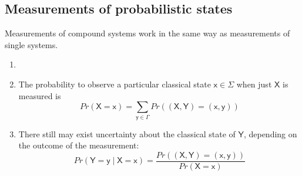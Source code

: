 \documentclass{report}
\begin{document}

\newpage

\subsection{Measurements of probabilistic states}
Measurements of compound systems work in the same way as measurements of single systems.


\begin{sol}
    \begin{enumerate}
        \item[]
        \item The probability to observe a particular classical state $\mathsf{x}\in\Sigma$ when just $\mathsf{X}$ is measured is
        \begin{equation*}
            Pr(\mathsf{X}=\mathsf{x})=\sum\limits_{\mathsf{y}\in\Gamma}Pr((\mathsf{X},\mathsf{Y})=(\mathsf{x},\mathsf{y}))
        \end{equation*}
        \item There still may exist uncertainty about the classical state of $\mathsf{Y}$, depending on the outcome of the measurement:
        \begin{equation*}
            Pr(\mathsf{Y}=\mathsf{y}\mid \mathsf{X}=\mathsf{x})=\dfrac{Pr((\mathsf{X},\mathsf{Y})=(\mathsf{x},\mathsf{y}))}{Pr(\mathsf{X}=\mathsf{x})}
        \end{equation*}
    \end{enumerate}
\end{sol}
\end{document}
